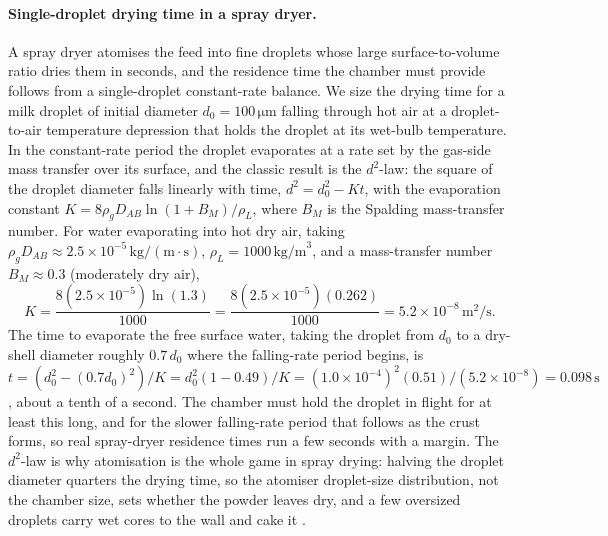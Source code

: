 \paragraph{Single-droplet drying time in a spray dryer.} A spray dryer
atomises the feed into fine droplets whose large surface-to-volume ratio dries
them in seconds, and the residence time the chamber must provide follows from
a single-droplet constant-rate balance. We size the drying time for a milk
droplet of initial diameter $d_0 = 100\,\si{\micro\meter}$ falling through hot
air at a droplet-to-air temperature depression that holds the droplet at its
wet-bulb temperature. In the constant-rate period the droplet evaporates at a
rate set by the gas-side mass transfer over its surface, and the classic
result is the $d^2$-law: the square of the droplet diameter falls linearly
with time, $d^2 = d_0^2 - K t$, with the evaporation constant $K = 8\rho_g
D_{AB}\ln(1 + B_M)/\rho_L$, where $B_M$ is the Spalding mass-transfer number.
For water evaporating into hot dry air, taking $\rho_g D_{AB} \approx
2.5\times 10^{-5}\,\text{kg}/(\text{m}\cdot\text{s})$, $\rho_L = 1000\,\text{
kg/m}^3$, and a mass-transfer number $B_M \approx 0.3$ (moderately dry air),
\[
K = \frac{8(2.5\times 10^{-5})\ln(1.3)}{1000} = \frac{8(2.5\times 10^{-5})
(0.262)}{1000} = 5.2\times 10^{-8}\,\si{\meter\squared\per\second}.
\]
The time to evaporate the free surface water, taking the droplet from $d_0$ to
a dry-shell diameter roughly $0.7\,d_0$ where the falling-rate period begins,
is $t = (d_0^2 - (0.7 d_0)^2)/K = d_0^2(1 - 0.49)/K = (1.0\times 10^{-4})^2
(0.51)/(5.2\times 10^{-8}) = 0.098\,\text{s}$, about a tenth of a second. The
chamber must hold the droplet in flight for at least this long, and for the
slower falling-rate period that follows as the crust forms, so real spray-dryer
residence times run a few seconds with a margin. The $d^2$-law is why
atomisation is the whole game in spray drying: halving the droplet diameter
quarters the drying time, so the atomiser droplet-size distribution, not the
chamber size, sets whether the powder leaves dry, and a few oversized droplets
carry wet cores to the wall and cake it \cite{text:perry-chemical-engineers}.

